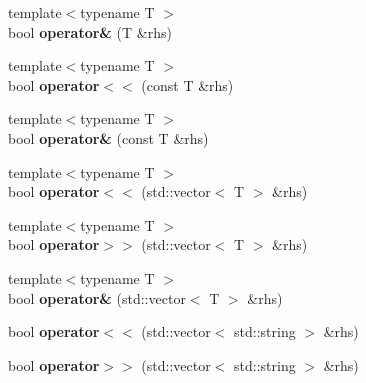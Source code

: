 \begin{DoxyCompactItemize}
\item 
\hypertarget{classBinaryStream_aab5b9db04d8f0da5bbf8a26bf347528f}{{\footnotesize template$<$typename T $>$ }\\bool {\bfseries operator\&} (T \&rhs)}\label{classBinaryStream_aab5b9db04d8f0da5bbf8a26bf347528f}

\item 
\hypertarget{classBinaryStream_a5d35da3114fb5570df28ea1e3a4e8fce}{{\footnotesize template$<$typename T $>$ }\\bool {\bfseries operator$<$$<$} (const T \&rhs)}\label{classBinaryStream_a5d35da3114fb5570df28ea1e3a4e8fce}

\item 
\hypertarget{classBinaryStream_ae99a183981d74ef9c2750e13ae38eab9}{{\footnotesize template$<$typename T $>$ }\\bool {\bfseries operator\&} (const T \&rhs)}\label{classBinaryStream_ae99a183981d74ef9c2750e13ae38eab9}

\item 
\hypertarget{classBinaryStream_a00d6e0b4b6bf11a8848116f206dec363}{{\footnotesize template$<$typename T $>$ }\\bool {\bfseries operator$<$$<$} (std\-::vector$<$ T $>$ \&rhs)}\label{classBinaryStream_a00d6e0b4b6bf11a8848116f206dec363}

\item 
\hypertarget{classBinaryStream_ae2bf62a35f010ee108e9c730b9022bd6}{{\footnotesize template$<$typename T $>$ }\\bool {\bfseries operator$>$$>$} (std\-::vector$<$ T $>$ \&rhs)}\label{classBinaryStream_ae2bf62a35f010ee108e9c730b9022bd6}

\item 
\hypertarget{classBinaryStream_a18219bb858eb598fba2c7f13124d1c20}{{\footnotesize template$<$typename T $>$ }\\bool {\bfseries operator\&} (std\-::vector$<$ T $>$ \&rhs)}\label{classBinaryStream_a18219bb858eb598fba2c7f13124d1c20}

\item 
\hypertarget{classBinaryStream_a7111a8a1fd05f68472250c955d8c2bb9}{bool {\bfseries operator$<$$<$} (std\-::vector$<$ std\-::string $>$ \&rhs)}\label{classBinaryStream_a7111a8a1fd05f68472250c955d8c2bb9}

\item 
\hypertarget{classBinaryStream_a20914e832cc3ee4de025151c0b781b11}{bool {\bfseries operator$>$$>$} (std\-::vector$<$ std\-::string $>$ \&rhs)}\label{classBinaryStream_a20914e832cc3ee4de025151c0b781b11}


\end{DoxyCompactItemize}
